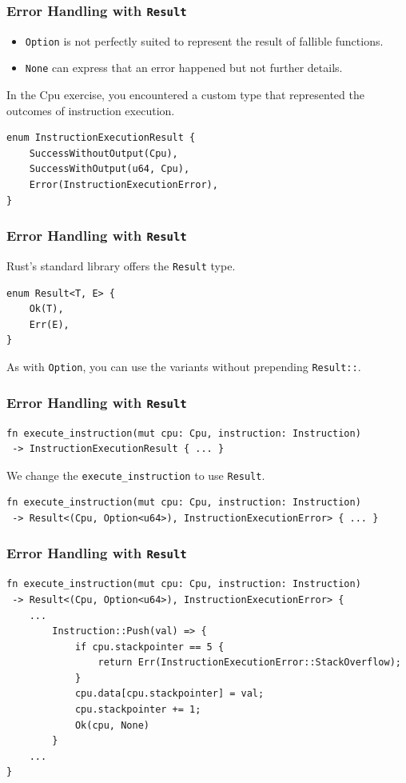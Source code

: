 \begin{frame}[fragile]
    \frametitle{Error Handling with \texttt{Result}}
    \begin{itemize}
        \item \texttt{Option} is not perfectly suited to represent the result of fallible functions.
        \item \texttt{None} can express that an error happened but not further details.
    \end{itemize}
    \pause
    \vfill
    In the Cpu exercise, you encountered a custom type that represented the outcomes of instruction execution.
    \vfill
    \begin{verbatim}
enum InstructionExecutionResult {
    SuccessWithoutOutput(Cpu),
    SuccessWithOutput(u64, Cpu),
    Error(InstructionExecutionError),
}
    \end{verbatim}
\end{frame}

\begin{frame}[fragile]
    \frametitle{Error Handling with \texttt{Result}}
    Rust's standard library offers the \texttt{Result} type.
    \vfill
    \begin{verbatim}
enum Result<T, E> {
    Ok(T),
    Err(E),
}
    \end{verbatim}
    \pause
    \vfill
    As with \texttt{Option}, you can use the variants without prepending \texttt{Result::}.
\end{frame}

\begin{frame}[fragile]
    \frametitle{Error Handling with \texttt{Result}}
    \begin{verbatim}
fn execute_instruction(mut cpu: Cpu, instruction: Instruction)
 -> InstructionExecutionResult { ... }
    \end{verbatim}
    \vfill
    We change the \texttt{execute\_instruction} to use \texttt{Result}.
    \pause
    \vfill
    \begin{verbatim}
fn execute_instruction(mut cpu: Cpu, instruction: Instruction)
 -> Result<(Cpu, Option<u64>), InstructionExecutionError> { ... }
    \end{verbatim}
\end{frame}

\begin{frame}[fragile]
    \frametitle{Error Handling with \texttt{Result}}
    \begin{verbatim}
fn execute_instruction(mut cpu: Cpu, instruction: Instruction)
 -> Result<(Cpu, Option<u64>), InstructionExecutionError> {
    ...
        Instruction::Push(val) => {
            if cpu.stackpointer == 5 {
                return Err(InstructionExecutionError::StackOverflow);
            }
            cpu.data[cpu.stackpointer] = val;
            cpu.stackpointer += 1;
            Ok(cpu, None)
        }
    ...
}
    \end{verbatim}
\end{frame}

